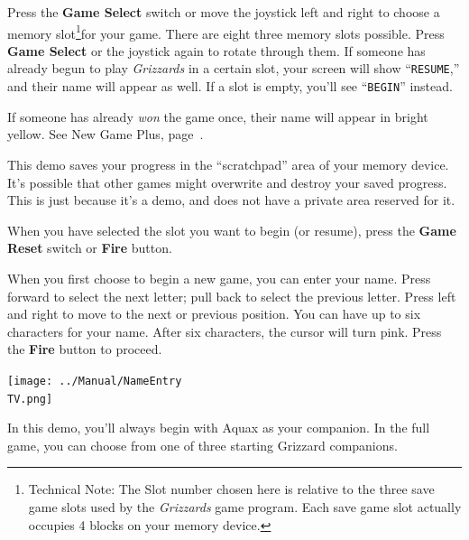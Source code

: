 \documentclass[10pt,twocolumn,openany,article]{memoir}
\newcommand\TV{NTSC}
\newcommand\TV{PAL}
\newcommand\TV{SECAM}
\begin{document}
Press  the \textbf{Game  Select} switch  or move  the joystick  left and
right             to             choose             a             memory
slot\ifdefined\ATARIAGESAVE\else\footnote{Technical   Note:   The   Slot
  number chosen  here is relative to  the three save game  slots used by
  the  \textit{Grizzards} game  program.  Each save  game slot  actually
  occupies 4 blocks on your memory  device.}\fi for your game. There are
\ifdefined\ATARIAGESAVE  eight \else  three  \fi  memory slots  possible.
Press \textbf{Game Select} or the joystick again to rotate through them.
If someone  has already  begun to play  \textit{Grizzards} in  a certain
slot, your  screen will  show ``\texttt{RESUME},''  and their  name will
appear    as    well.    If    a   slot    is    empty,    you'll    see
``\texttt{BEGIN}'' instead.

If someone has already \emph{won} the  game once, their name will appear
in bright yellow. See New Game Plus, page~\pageref{sec:NewGamePlus}.

\ifdefined\DEMO

\skip

This demo saves your progress in  the ``scratchpad'' area of your memory
device. It's possible that other  games might overwrite and destroy your
saved progress.  This is  just because  it's a demo,  and does  not have
a private area reserved for it.

\skip

\fi

When you have selected the slot you want to begin (or resume), press the
\textbf{Game Reset} switch or \textbf{Fire} button.

\fi

\ifdefined\NOSAVE\else

When you  first choose  to begin a  new game, you  can enter  your name.
Press  forward to  select  the  next letter;  pull  back  to select  the
previous letter.  Press left and right  to move to the  next or previous
position. You  can have up  to six characters  for your name.  After six
characters, the  cursor will turn  pink. Press the  \textbf{Fire} button
to proceed.

\begin{center}
  \texttt{[image: ../Manual/NameEntry\\TV.png]}
\end{center}

\ifdefined\DEMO

In this demo,  you'll always begin with Aquax as  your companion. In the
full game, you can choose from one of three starting Grizzard companions.
\end{document}
